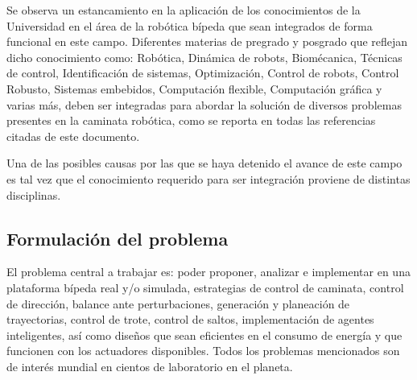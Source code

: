Se observa un estancamiento en la aplicaci\'on de los conocimientos de la Universidad en el \'area de la rob\'otica b\'ipeda que sean integrados de forma funcional en este campo. Diferentes materias de pregrado y posgrado que reflejan dicho conocimiento como: Rob\'otica, Din\'amica de robots, Biom\'ecanica, T\'ecnicas de control, Identificaci\'on de sistemas, Optimizaci\'on, Control de robots, Control Robusto, Sistemas embebidos, Computaci\'on flexible, Computaci\'on gr\'afica y varias m\'as, deben ser integradas para abordar la soluci\'on de diversos problemas presentes en la caminata rob\'otica, como se reporta en todas las referencias citadas de este documento.\par
Una de las posibles causas por las que se haya detenido el avance de este campo es tal vez que el conocimiento requerido para ser integraci\'on proviene de distintas disciplinas.\par

\subsection[Formulaci\'on]{Formulaci\'on del problema}
El problema central a trabajar es: poder proponer, analizar e implementar en una plataforma b\'ipeda real y/o simulada, estrategias de control de caminata, control de direcci\'on, balance ante perturbaciones, generaci\'on y planeaci\'on de trayectorias, control de trote, control de saltos, implementaci\'on de agentes inteligentes, as\'i como dise\~nos que sean eficientes en el consumo de energ\'ia y que funcionen con los actuadores disponibles. Todos los problemas mencionados son de inter\'es mundial en cientos de laboratorio en el planeta.

